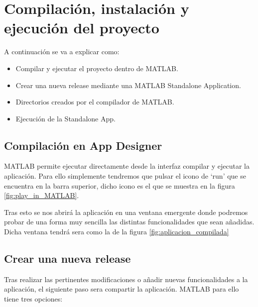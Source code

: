 \section{Compilación, instalación y ejecución del proyecto}\label{compilación-instalación-ejecución}

A continuación se va a explicar como:

\begin{itemize}
    \item Compilar y ejecutar el proyecto dentro de MATLAB.
    \item Crear una nueva release mediante una MATLAB Standalone Application.
    \item Directorios creados por el compilador de MATLAB.
    \item Ejecución de la Standalone App.
\end{itemize}

\subsection{Compilación en App Designer}\label{compilación-en-app-designer}

MATLAB permite ejecutar directamente desde la interfaz compilar y ejecutar la aplicación. Para ello simplemente tendremos que pulsar el icono de `run' que se encuentra en la barra superior, dicho icono es el que se muestra en la figura \ref{fig:play_in_MATLAB}.


Tras esto se nos abrirá la aplicación en una ventana emergente donde podremos probar de una forma muy sencilla las distintas funcionalidades que sean añadidas. Dicha ventana tendrá sera como la de la figura \ref{fig:aplicacion_compilada}


\subsection{Crear una nueva release}\label{crear-una-nueva-release}

Tras realizar las pertinentes modificaciones o añadir nuevas funcionalidades a la aplicación, el siguiente paso sera compartir la aplicación. MATLAB para ello tiene tres opciones:

